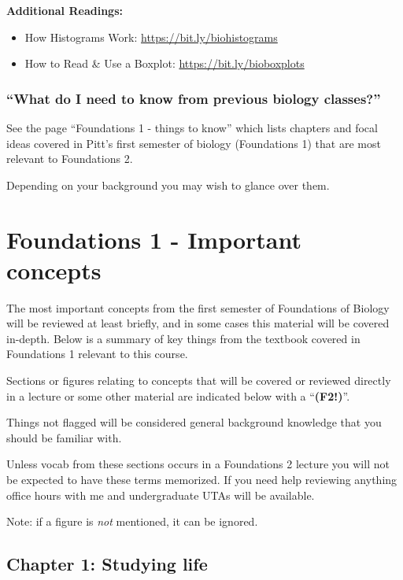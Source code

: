 \documentclass[
]{book}
\providecommand{\tightlist}{%
  \setlength{\itemsep}{0pt}\setlength{\parskip}{0pt}}
\begin{document}
\textbf{Additional Readings:}

\begin{itemize}
\tightlist
\item
  How Histograms Work: \url{https://bit.ly/biohistograms}
\item
  How to Read \& Use a Boxplot: \url{https://bit.ly/bioboxplots}
\end{itemize}

\hypertarget{what-do-i-need-to-know-from-previous-biology-classes}{%
\subsection{``What do I need to know from previous biology classes?''}\label{what-do-i-need-to-know-from-previous-biology-classes}}

See the page ``Foundations 1 - things to know'' which lists chapters and focal ideas covered in Pitt's first semester of biology (Foundations 1) that are most relevant to Foundations 2.

Depending on your background you may wish to glance over them.

\hypertarget{f1}{%
\chapter{Foundations 1 - Important concepts}\label{f1}}

The most important concepts from the first semester of Foundations of Biology will be reviewed at least briefly, and in some cases this material will be covered in-depth. Below is a summary of key things from the textbook covered in Foundations 1 relevant to this course.

Sections or figures relating to concepts that will be covered or reviewed directly in a lecture or some other material are indicated below with a ``\textbf{(F2!)}''.

Things not flagged will be considered general background knowledge that you should be familiar with.

Unless vocab from these sections occurs in a Foundations 2 lecture you will not be expected to have these terms memorized. If you need help reviewing anything office hours with me and undergraduate UTAs will be available.

Note: if a figure is \emph{not} mentioned, it can be ignored.

\hypertarget{chapter-1-studying-life}{%
\section{Chapter 1: Studying life}\label{chapter-1-studying-life}}
\end{document}
